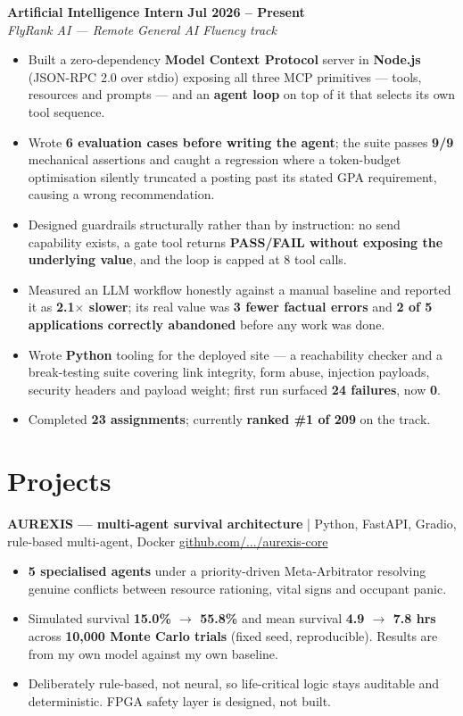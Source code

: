 \documentclass[a4paper,10pt]{article}
\newcommand{\role}[4]{%
  \textbf{#1} \hfill \textbf{#3}\\
  \textit{#2} \hfill \textit{#4}\\[0.2em]
}
\newcommand{\project}[3]{%
  \textbf{#1} \; | \; \small #2 \hfill \small #3\\[0.15em]
}
\begin{document}
\role{Artificial Intelligence Intern}{FlyRank AI --- Remote}{Jul 2026 -- Present}{General AI Fluency track}
\begin{itemize}
  \item Built a zero-dependency \textbf{Model Context Protocol} server in \textbf{Node.js}
        (JSON-RPC 2.0 over stdio) exposing all three MCP primitives --- tools, resources and prompts
        --- and an \textbf{agent loop} on top of it that selects its own tool sequence.
  \item Wrote \textbf{6 evaluation cases before writing the agent}; the suite passes \textbf{9/9}
        mechanical assertions and caught a regression where a token-budget optimisation silently
        truncated a posting past its stated GPA requirement, causing a wrong recommendation.
  \item Designed guardrails structurally rather than by instruction: no send capability exists, a
        gate tool returns \textbf{PASS/FAIL without exposing the underlying value}, and the loop is
        capped at 8 tool calls.
  \item Measured an LLM workflow honestly against a manual baseline and reported it as
        \textbf{2.1$\times$ slower}; its real value was \textbf{3 fewer factual errors} and
        \textbf{2 of 5 applications correctly abandoned} before any work was done.
  \item Wrote \textbf{Python} tooling for the deployed site --- a reachability checker and a
        break-testing suite covering link integrity, form abuse, injection payloads, security
        headers and payload weight; first run surfaced \textbf{24 failures}, now \textbf{0}.
  \item Completed \textbf{23 assignments}; currently \textbf{ranked \#1 of 209} on the track.
\end{itemize}

\section{Projects}

\project{AUREXIS --- multi-agent survival architecture}{Python, FastAPI, Gradio, rule-based multi-agent, Docker}{\href{https://github.com/FarhanRajputFelix/aurexis-core}{github.com/.../aurexis-core}}
\begin{itemize}
  \item \textbf{5 specialised agents} under a priority-driven Meta-Arbitrator resolving genuine
        conflicts between resource rationing, vital signs and occupant panic.
  \item Simulated survival \textbf{15.0\% $\rightarrow$ 55.8\%} and mean survival
        \textbf{4.9 $\rightarrow$ 7.8 hrs} across \textbf{10,000 Monte Carlo trials}
        (fixed seed, reproducible). Results are from my own model against my own baseline.
  \item Deliberately rule-based, not neural, so life-critical logic stays auditable and
        deterministic. FPGA safety layer is designed, not built.
\end{itemize}
\end{document}
